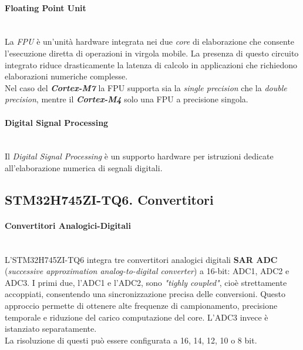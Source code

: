 \paragraph{\small{Floating Point Unit}}\mbox{}\\
La \textit{FPU} è un'unità hardware integrata nei due \textit{core} di elaborazione che consente l'esecuzione diretta di operazioni in virgola mobile. La presenza di questo circuito integrato riduce drasticamente la latenza di calcolo in applicazioni che richiedono elaborazioni numeriche complesse.\\
Nel caso del \textit{\textbf{Cortex-M7}} la FPU supporta sia la \textit{single precision} che la \textit{double precision}, mentre il \textit{\textbf{Cortex-M4}} solo una FPU a precisione singola.

\paragraph{\small{Digital Signal Processing}}\mbox{}\\
Il \textit{Digital Signal Processing} è un supporto hardware per istruzioni dedicate all'elaborazione numerica di segnali digitali. 




\subsection{STM32H745ZI-TQ6. Convertitori}
\paragraph{\small{Convertitori Analogici-Digitali}}\mbox{}\\
L'STM32H745ZI-TQ6 integra tre convertitori analogici digitali \textbf{SAR ADC} (\textit{successive approximation analog-to-digital converter}) a 16-bit: ADC1, ADC2 e ADC3.
I primi due, l'ADC1 e l'ADC2, sono \textit{"tighly coupled"}, cioè strettamente accoppiati, consentendo una sincronizzazione precisa delle conversioni. Questo approccio permette di ottenere alte frequenze di campionamento, precisione temporale e riduzione del carico computazione del core. L'ADC3 invece è istanziato separatamente.\\
La risoluzione di questi può essere configurata a 16, 14, 12, 10 o 8 bit.

